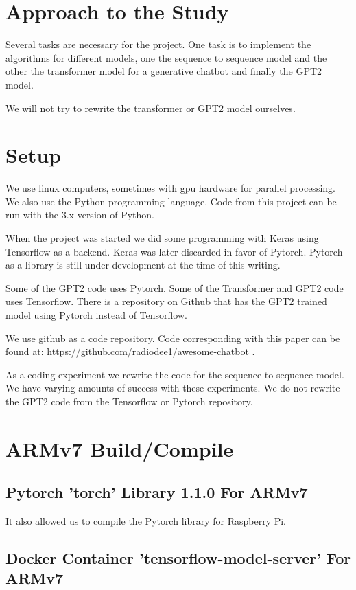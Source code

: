 \section{Approach to the Study}

Several tasks are necessary for the project. One task is to implement
the algorithms for different models, one the sequence to sequence model
and the other the transformer model for a generative chatbot and finally the GPT2 model.

We will not try to rewrite the transformer or GPT2 model ourselves.

\section{Setup}

We use linux computers, sometimes with gpu hardware for parallel processing.
We also use the Python programming language. Code from this project
can be run with the 3.x version of Python.

When the project was started we did some programming with Keras using
Tensorflow as a backend. Keras was later discarded in favor of Pytorch.
Pytorch as a library is still under development at the time of this
writing.

Some of the GPT2 code uses Pytorch. Some of the Transformer and GPT2 code uses Tensorflow. There
is a repository on Github that has the GPT2 trained model using Pytorch instead of Tensorflow.

We use github as a code repository. Code corresponding with this paper
can be found at: \href{https://github.com/radiodee1/awesome-chatbot}{https://github.com/radiodee1/awesome-chatbot}
. 

As a coding experiment we rewrite the code for the sequence-to-sequence model. We have varying amounts of success with these experiments. We do not rewrite the GPT2 code from the Tensorflow or Pytorch repository.

\section{ARMv7 Build/Compile}

\subsection*{Pytorch 'torch' Library 1.1.0 For ARMv7}
It also allowed us to compile the Pytorch library for Raspberry Pi.

\subsection*{Docker Container 'tensorflow-model-server' For ARMv7}

